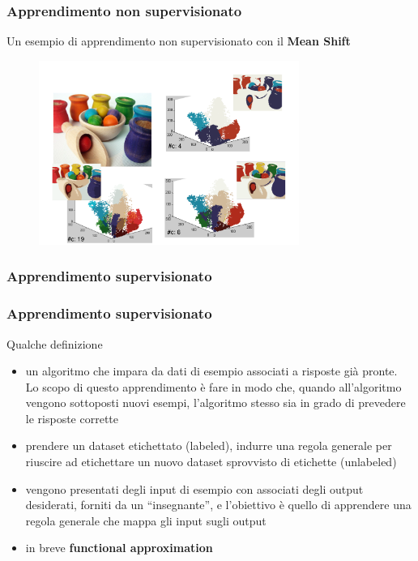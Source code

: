 \begin{frame}

	\frametitle{Apprendimento non supervisionato}

	\begin{block}{Un esempio di apprendimento non supervisionato con il \textbf{Mean Shift}}
		\begin{figure}[!htbp]
			\centering
			\includegraphics[width=8.5cm]{images/unsupervised/non_parametric/meanshift_pots.pdf}
		\end{figure}

	\end{block}

\end{frame}



\subsubsection{Apprendimento supervisionato}
\begin{frame}

	\frametitle{Apprendimento supervisionato}

	\begin{block}{Qualche definizione}
		\begin{itemize}
			\item un algoritmo che impara da dati di esempio associati a risposte già pronte.\\
				Lo scopo di questo apprendimento è fare in modo che, quando all'algoritmo vengono sottoposti nuovi esempi, l'algoritmo stesso sia in grado di prevedere le risposte corrette
			\item prendere un dataset etichettato (labeled), indurre una regola generale per riuscire ad etichettare un nuovo dataset sprovvisto di etichette (unlabeled)
			\item vengono presentati degli input di esempio con associati  degli output desiderati, forniti da un ``insegnante'', e l'obiettivo è quello di apprendere una regola generale che mappa gli input sugli output
			\item in breve \textbf{functional approximation}
		\end{itemize}
	\end{block}

\end{frame}



